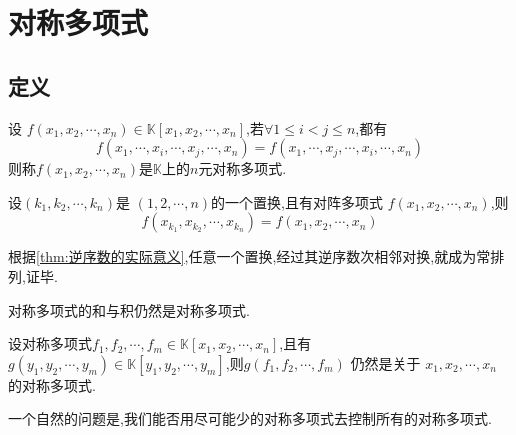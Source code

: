 \section{对称多项式}
\subsection{定义}
\begin{formal}
\begin{definition}[对称多项式]\label{def:对称多项式}
    设 $f\left(
        x_1,x_2,\cdots,x_n
    \right)\in\mathbb{K}\left[
        x_1,x_2,\cdots,x_n
    \right]$,若$\forall 1\leqslant i<j\leqslant n$,都有
    \[
    f\left(
        x_1,\cdots,x_i,\cdots,x_j,\cdots,x_n
    \right)=
    f\left(
        x_1,\cdots,x_j,\cdots,x_i,\cdots,x_n
    \right)
    \]则称$f\left(
        x_1,x_2,\cdots,x_n
    \right)$是$\mathbb{K}$上的$n$元对称多项式.
\end{definition}
\end{formal}
\begin{green}
\begin{lemma}[置换下定义]\label{lem:置换下定义}
    设$
     \left(
        k_1,k_2,\cdots,k_n
     \right)
    $是 $\left(
        1,2,\cdots,n
    \right)$的一个置换,且有对阵多项式
    $f\left(
        x_1,x_2,\cdots,x_n
    \right)$,则
    \[
    f\left(
        x_{k_1},x_{k_2},\cdots,x_{k_n}
    \right)=f\left(
        x_1,x_2,\cdots,x_n
    \right)
    \]
\end{lemma}
\begin{Proof}
根据\cref{thm:逆序数的实际意义},任意一个置换,经过其逆序数次相邻对换,就成为常排列,证毕.
\end{Proof}
\end{green}
\begin{green}
\begin{corollary}[对称多项式的和与积]\label{cor:对称多项式的和与积}
    对称多项式的和与积仍然是对称多项式.
\end{corollary}
\end{green}
\begin{green}
\begin{lemma}[对称多项式的复合]\label{lem:对称多项式的复合}
    设对称多项式$f_1,f_2,\cdots,f_m\in\mathbb{K}\left[
        x_1,x_2,\cdots,x_n
    \right]$,且有$g\left(
        y_1,y_2,\cdots,y_m
    \right)\in\mathbb{K}\left[
        y_1,y_2,\cdots,y_m
    \right]$,则$
    g\left(
        f_1,f_2,\cdots,f_m
    \right)
    $
    仍然是关于
    $x_1,x_2,\cdots,x_n$
    的对称多项式.
\end{lemma}
\end{green}
一个自然的问题是,我们能否用尽可能少的对称多项式去控制所有的对称多项式.
